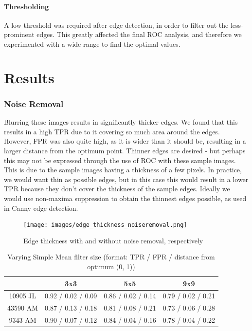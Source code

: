 \documentclass[10pt,a4paper]{article}
\begin{document}
\paragraph{Thresholding}
A low threshold was required after edge detection, in order to filter out the less-prominent edges. This greatly affected the final ROC analysis, and therefore we experimented with a wide range to find the optimal values. 


\section*{Results}
\subsubsection*{Noise Removal}
Blurring these images results in significantly thicker edges. We found that this results in a high TPR due to it covering so much area around the edges. However, FPR was also quite high, as it is wider than it should be, resulting in a larger distance from the optimum point. Thinner edges are desired - but perhaps this may not be expressed through the use of ROC with these sample images. This is due to the sample images having a thickness of a few pixels. In practice, we would want thin as possible edges, but in this case this would result in a lower TPR because they don’t cover the thickness of the sample edges. Ideally we would use non-maxima suppression to obtain the thinnest edges possible, as used in Canny edge detection.

\begin{figure}[H]
\centering
\texttt{[image: images/edge\_thickness\_noiseremoval.png]}
\caption{Edge thickness with and without noise removal, respectively}
\label{edge_thickness_noise_removal}
\end{figure}

\begin{table}[H]
\centering
\caption{Varying Simple Mean filter size (format: TPR / FPR / distance from optimum (0, 1))}
\begin{tabular}{|c|c|c|c|}
\hline
\textbf{} & \textbf{3x3}       & \textbf{5x5}       & \textbf{9x9}       \\ \hline
10905 JL  & 0.92 / 0.02 / 0.09 & 0.86 / 0.02 / 0.14 & 0.79 / 0.02 / 0.21 \\ \hline
43590 AM  & 0.87 / 0.13 / 0.18 & 0.81 / 0.08 / 0.21 & 0.73 / 0.06 / 0.28 \\ \hline
9343 AM   & 0.90 / 0.07 / 0.12 & 0.84 / 0.04 / 0.16 & 0.78 / 0.04 / 0.22 \\ \hline
\end{tabular}
\end{table}
\end{document}
